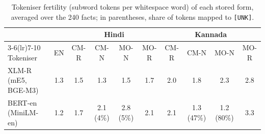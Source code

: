 \begin{table}[t]
\centering
\small
\setlength{\tabcolsep}{4pt}
\caption{Tokeniser fertility (subword tokens per whitespace word) of each stored form, averaged over the 240 facts; in parentheses, share of tokens mapped to \texttt{[UNK]}.}
\label{tab:fertility}
\begin{tabular}{@{}l c cccc cccc@{}}
\toprule
 & & \multicolumn{4}{c}{Hindi} & \multicolumn{4}{c}{Kannada} \\
\cmidrule(lr){3-6}\cmidrule(lr){7-10}
Tokeniser & EN & CM-R & CM-N & MO-N & MO-R & CM-R & CM-N & MO-N & MO-R \\
\midrule
XLM-R (mE5, BGE-M3) & 1.3 & 1.5 & 1.3 & 1.5 & 1.7 & 2.0 & 1.8 & 2.3 & 2.8 \\
BERT-en (MiniLM-en) & 1.2 & 1.7 & 2.1 (4\%) & 2.8 (5\%) & 2.1 & 2.1 & 1.3 (47\%) & 1.2 (80\%) & 3.3 \\
\bottomrule
\end{tabular}
\end{table}
